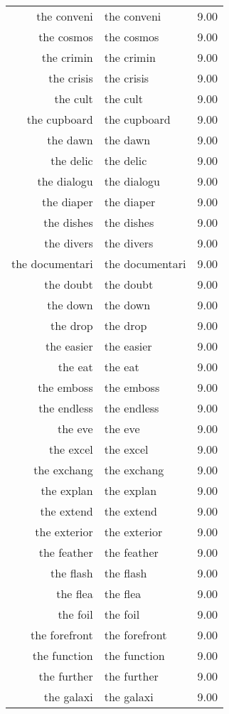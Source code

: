 \begin{table}[ht]
\begin{tabular}{rlr}
  the conveni & the conveni & 9.00 \\ 
  the cosmos & the cosmos & 9.00 \\ 
  the crimin & the crimin & 9.00 \\ 
  the crisis & the crisis & 9.00 \\ 
  the cult & the cult & 9.00 \\ 
  the cupboard & the cupboard & 9.00 \\ 
  the dawn & the dawn & 9.00 \\ 
  the delic & the delic & 9.00 \\ 
  the dialogu & the dialogu & 9.00 \\ 
  the diaper & the diaper & 9.00 \\ 
  the dishes & the dishes & 9.00 \\ 
  the divers & the divers & 9.00 \\ 
  the documentari & the documentari & 9.00 \\ 
  the doubt & the doubt & 9.00 \\ 
  the down & the down & 9.00 \\ 
  the drop & the drop & 9.00 \\ 
  the easier & the easier & 9.00 \\ 
  the eat & the eat & 9.00 \\ 
  the emboss & the emboss & 9.00 \\ 
  the endless & the endless & 9.00 \\ 
  the eve & the eve & 9.00 \\ 
  the excel & the excel & 9.00 \\ 
  the exchang & the exchang & 9.00 \\ 
  the explan & the explan & 9.00 \\ 
  the extend & the extend & 9.00 \\ 
  the exterior & the exterior & 9.00 \\ 
  the feather & the feather & 9.00 \\ 
  the flash & the flash & 9.00 \\ 
  the flea & the flea & 9.00 \\ 
  the foil & the foil & 9.00 \\ 
  the forefront & the forefront & 9.00 \\ 
  the function & the function & 9.00 \\ 
  the further & the further & 9.00 \\ 
  the galaxi & the galaxi & 9.00 \\ 

\end{tabular}
\end{table}
